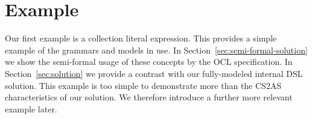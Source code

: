 \documentclass{llncs}
\begin{document}




\section{Example}
\label{sec:example}

Our first example is a collection literal expression. This provides a simple example of the grammars and models in use. In Section~\ref{sec:semi-formal-solution} we show the semi-formal usage of these concepts by the OCL specification. In Section~\ref{sec:solution} we provide a contrast with our fully-modeled internal DSL solution. This example is too simple to demonstrate more than the CS2AS characteristics of our solution. We therefore introduce a further more relevant example later.
\end{document}
